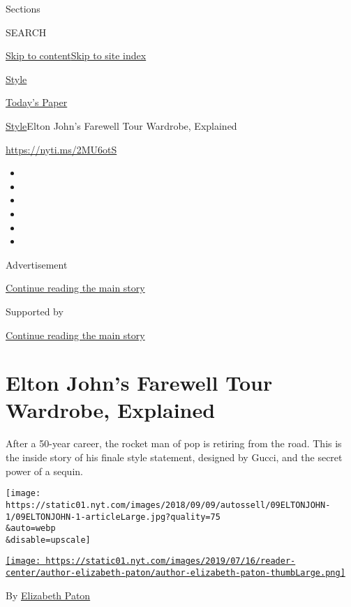 Sections

SEARCH

\protect\hyperlink{site-content}{Skip to
content}\protect\hyperlink{site-index}{Skip to site index}

\href{https://www.nytimes.com/section/style}{Style}

\href{https://myaccount.nytimes.com/auth/login?response_type=cookie\&client_id=vi}{}

\href{https://www.nytimes.com/section/todayspaper}{Today's Paper}

\href{/section/style}{Style}\textbar{}Elton John's Farewell Tour
Wardrobe, Explained

\url{https://nyti.ms/2MU6otS}

\begin{itemize}
\item
\item
\item
\item
\item
\item
\end{itemize}

Advertisement

\protect\hyperlink{after-top}{Continue reading the main story}

Supported by

\protect\hyperlink{after-sponsor}{Continue reading the main story}

\hypertarget{elton-johns-farewell-tour-wardrobe-explained}{%
\section{Elton John's Farewell Tour Wardrobe,
Explained}\label{elton-johns-farewell-tour-wardrobe-explained}}

After a 50-year career, the rocket man of pop is retiring from the road.
This is the inside story of his finale style statement, designed by
Gucci, and the secret power of a sequin.

\texttt{[image: https://static01.nyt.com/images/2018/09/09/autossell/09ELTONJOHN-1/09ELTONJOHN-1-articleLarge.jpg?quality=75\\\&auto=webp\\\&disable=upscale]}

\href{https://www.nytimes.com/by/elizabeth-paton}{\texttt{[image: https://static01.nyt.com/images/2019/07/16/reader-center/author-elizabeth-paton/author-elizabeth-paton-thumbLarge.png]}}

By \href{https://www.nytimes.com/by/elizabeth-paton}{Elizabeth Paton}

